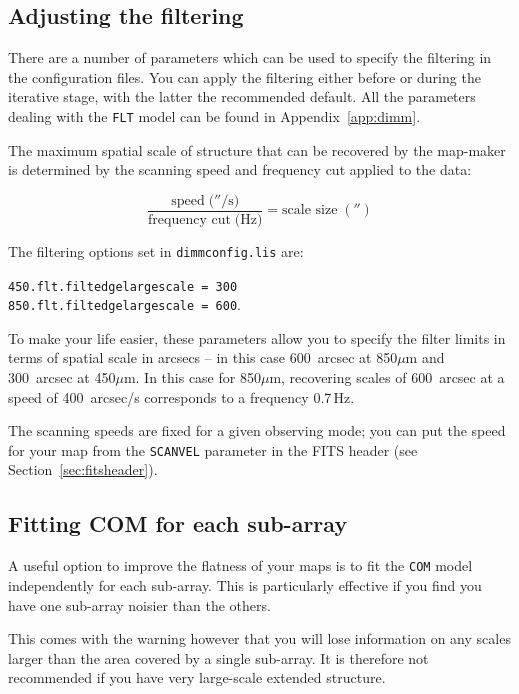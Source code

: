 \documentclass[twoside,11pt]{article}
\newcommand{\htmlref}[2]{#1}
\newcommand{\latexhtml}[2]{#1}
\newcommand{\xlabel}[1]{}
\renewcommand{\_}{\texttt{\symbol{95}}}
\newcommand{\cref}[3]{\latexhtml{#1~\ref{#2}}{\htmlref{#3}{#2}}}
\begin{document}
\subsection{\xlabel{filter}Adjusting the filtering}
\label{sec:filt}

There are a number of parameters which can be used to specify the
filtering in the configuration files. You can apply the filtering
either before or during the iterative stage, with the latter the
recommended default. All the parameters dealing with the \texttt{FLT}
model can be found in \cref{Appendix}{app:dimm}{this appendix}.

The maximum spatial scale of structure that can be recovered by the
map-maker is determined by the scanning speed and frequency cut
applied to the data:

\begin{equation}
\frac{\mbox{speed}\;(''/\mbox{s)}}{\mbox{frequency cut}\;(\mbox{Hz)}}=\mbox{scale size}\;('')
\end{equation}

The filtering options set in \texttt{dimmconfig.lis} are:

\texttt{450.flt.filt\_edge\_largescale = 300} \\
\texttt{850.flt.filt\_edge\_largescale = 600}.

To make your life easier, these parameters allow you to specify
the filter limits in terms of spatial scale in arcsecs -- in this case
600~arcsec at 850$\mu$m and 300~arcsec at 450$\mu$m. In this case for
850$\mu$m, recovering scales of 600~arcsec at a speed of 400~arcsec/s
corresponds to a frequency 0.7\,Hz.

The scanning speeds are fixed for a given observing mode; you can put
the speed for your map from the \texttt{SCAN\_VEL} parameter in the
FITS header (see \cref{Section}{sec:fitsheader}{Headers and file
structure}).


\subsection{\xlabel{filter}Fitting COM for each sub-array}
\label{sec:com}

A useful option to improve the flatness of your maps is to fit the
\texttt{COM} model independently for each sub-array. This is
particularly effective if you find you have one sub-array noisier than
the others.

This comes with the warning however that you will lose information on
any scales larger than the area covered by a single sub-array. It is
therefore not recommended if you have very large-scale extended
structure.
\end{document}
